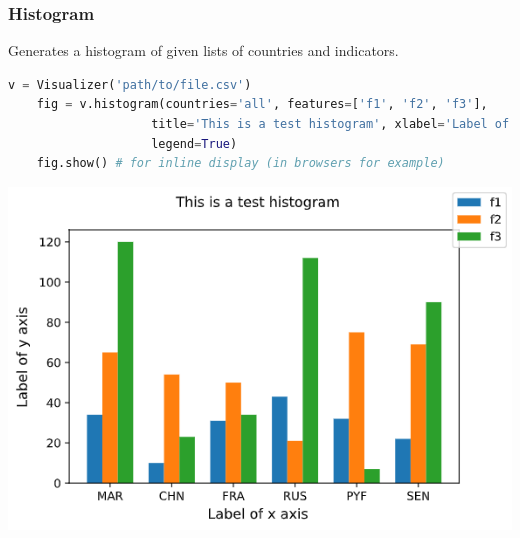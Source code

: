 \begin{frame}[fragile,shrink=30]
  \frametitle{Histogram}
  Generates a histogram of given lists of countries and indicators.
    \begin{lstlisting}[language=Python]
    v = Visualizer('path/to/file.csv')
    fig = v.histogram(countries='all', features=['f1', 'f2', 'f3'],
                    title='This is a test histogram', xlabel='Label of x axis', ylabel='Label of y axis', 
                    legend=True)
    fig.show() # for inline display (in browsers for example)
    \end{lstlisting}
    \begin{center}
    \includegraphics[scale=0.6]{beamer/inc/graphics/histogram.png}
    \end{center}
\end{frame}